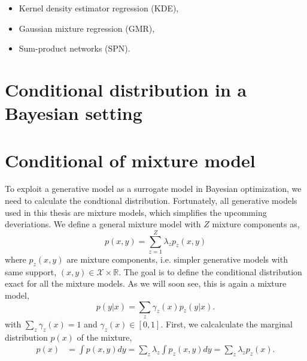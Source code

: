 \begin{itemize}[noitemsep]
     \item Kernel density estimator regression (KDE),
     \item Gaussian mixture regression (GMR),
     \item Sum-product networks (SPN).
 \end{itemize}




 \section{Conditional distribution in a Bayesian setting}\label{mixture_include_prior}
 




\section{Conditional of mixture model}\label{Conditional_mixture}
To exploit a generative model as a surrogate model in Bayesian optimization, we need to calculate
the condtional distribution. Fortunately, all generative models used in this thesis are mixture
models, which simplifies the upcomming deveriations. We define a general mixture model with $Z$ mixture
components as, 
$$p(x,y) = \sum_{z=1}^Z \lambda_z p_z(x,y)$$ where $p_z(x,y)$ are mixture components, i.e. simpler
generative models with same support, $(x,y) \in \mathcal{X}\times \mathbb{R}$. 
The goal is to define
the conditional distribution exact for all the mixture models. As we will soon see, this is again a
mixture model, 
$$p(y|x) = \sum_z \gamma_z(x) p_z(y|x).$$ with $\sum_z \gamma_z(x) = 1$ and $\gamma_z(x) \in [0,1]$.
First, we calcalculate the marginal distribution $p(x)$ of the mixture, 
\begin{align*}
    p(x) &= \int p(x,y) dy =\sum_{z} \lambda_z \int p_z(x,y) dy =\sum_{z} \lambda_z p_z(x).
\end{align*}

